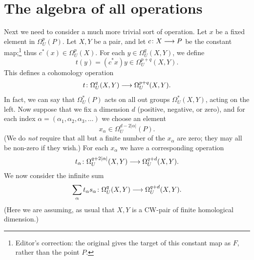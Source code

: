 \documentclass[../main]{subfiles}
\begin{document}

\chapter{The algebra of all operations}
\label{sec:p1c6}

Next we need to consider a much more trivial sort of operation. Let $x$ be a fixed element in $\Omega_U^p(P)$. Let $X,Y$ be a pair, and let $c \colon X \longrightarrow P$ be the constant map;\footnote{Editor's correction: the original gives the target of this constant map as $F$, rather than the point $P$.} thus $c^*(x) \in \Omega_U^p(X)$. For each $y \in \Omega_U^q(X,Y)$, we define
\[t(y) = (c^* x)y \in \Omega_U^{p+q}(X,Y).\]
This defines a cohomology operation
\[t\colon \Omega_U^q(X,Y) \longrightarrow \Omega_U^{p+q}(X,Y).\]
In fact, we can say that $\Omega_U^*(P)$ acts on all out groups $\Omega_U^*(X,Y)$, acting on the left. 
Now suppose that we fix a dimension $d$ (positive, negative, or zero), and for each index $\alpha = (\alpha_1, \alpha_2, \alpha_3, \dots)$ we choose an element 
\[x_\alpha \in \Omega_U^{d - 2|\alpha|}(P).\]
(We do \emph{not} require that all but a finite number of the $x_\alpha$ are zero; they may all be non-zero if they wish.) For each $x_\alpha$ we have a corresponding operation
\[t_\alpha \colon \Omega_U^{q + 2|\alpha|}(X,Y) \longrightarrow \Omega_U^{q+d}(X,Y).\]
We now consider the infinite sum 
\[\sum_\alpha t_\alpha s_\alpha \colon \Omega^q_U(X,Y) \longrightarrow \Omega_U^{q+d}(X,Y).\]
(Here we are assuming, as usual that $X,Y$ is a CW-pair of finite homological dimension.)
\end{document}
